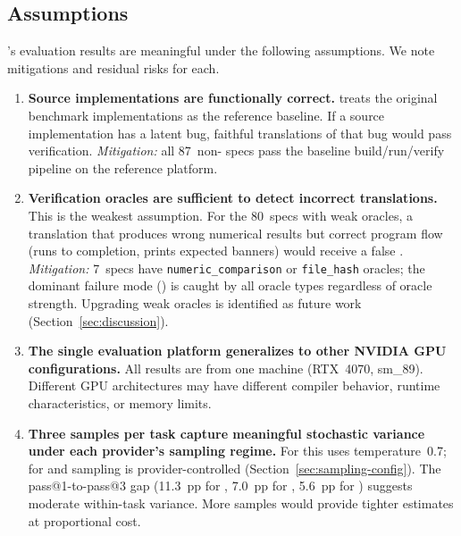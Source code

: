 \subsection{Assumptions}
\label{sec:ec-assumptions}

\parbench{}'s evaluation results are meaningful under the following assumptions.
We note mitigations and residual risks for each.

\begin{enumerate}
  \item \textbf{Source implementations are functionally correct.} \parbench{}
    treats the original benchmark implementations as the reference baseline. If a source
    implementation has a latent bug, faithful translations of that bug would
    pass verification. \textit{Mitigation:} all 87~non-\knownfail{} specs pass
    the baseline build/run/verify pipeline on the reference platform.

  \item \textbf{Verification oracles are sufficient to detect incorrect
    translations.} This is the weakest assumption. For the 80~specs with weak
    oracles, a translation that produces wrong numerical results but correct
    program flow (runs to completion, prints expected banners) would receive a
    false \pass{}. \textit{Mitigation:} 7~specs have
    \texttt{numeric\_comparison} or \texttt{file\_hash} oracles; the dominant
    failure mode (\buildfail{}) is caught by all oracle types regardless of
    oracle strength. Upgrading weak oracles is identified as future work
    (Section~\ref{sec:discussion}).

  \item \textbf{The single evaluation platform generalizes to other NVIDIA GPU
    configurations.} All results are from one machine (RTX~4070, sm\_89).
    Different GPU architectures may have different compiler behavior, runtime
    characteristics, or memory limits.
    
    \item \textbf{Three samples per task capture meaningful stochastic variance under each provider's sampling regime.} For \qwenshort{} this uses temperature~0.7; for \gptnew{} and \codex{} sampling is provider-controlled (Section~\ref{sec:sampling-config}). The pass@1-to-pass@3 gap (11.3~pp for \qwenshort{}, 7.0~pp for \gptnew{}, 5.6~pp for \codex{}) suggests moderate within-task variance. More samples would provide tighter estimates at proportional cost.
      

\end{enumerate}
